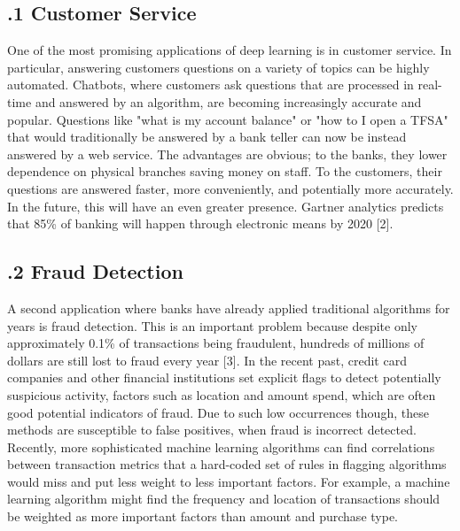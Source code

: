 \documentclass[12pt]{report}
\begin{document}
\subsection*{.1 Customer Service}
\par\indent
One of the most promising applications of deep learning is in customer service. In particular, answering customers questions on a variety of topics can be highly automated. Chatbots, where customers ask questions that are processed in real-time and answered by an algorithm, are becoming increasingly accurate and popular. Questions like "what is my account balance" or "how to I open a TFSA" that would traditionally be answered by a bank teller can now be instead answered by a web service. The advantages are obvious; to the banks, they lower dependence on physical branches saving money on staff. To the customers, their questions are answered faster, more conveniently, and potentially more accurately. In the future, this will have an even greater presence. Gartner analytics predicts that 85\% of banking will happen through electronic means by 2020 [2].

\newpage\thispagestyle{fancy}\sectionfont{\scshape}
\subsection*{.2 Fraud Detection}
\par\indent
A second application where banks have already applied traditional algorithms for years is fraud detection. This is an important problem because despite only approximately 0.1\% of transactions being fraudulent, hundreds of millions of dollars are still lost to fraud every year [3].  In the recent past, credit card companies and other financial institutions set explicit flags to detect potentially suspicious activity, factors such as location and amount spend, which are often good potential indicators of fraud. Due to such low occurrences though, these methods are susceptible to false positives, when fraud is incorrect detected. Recently, more sophisticated machine learning algorithms can find correlations between transaction metrics that a hard-coded set of rules in flagging algorithms would miss and put less weight to less important factors. For example, a machine learning algorithm might find the frequency and location of transactions should be weighted as more important factors than amount and purchase type.
\end{document}
